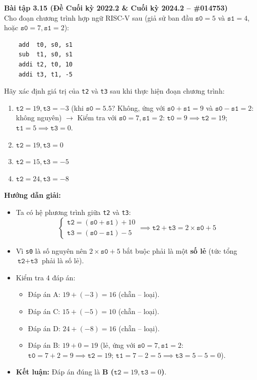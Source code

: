 \textbf{Bài tập 3.15 (Đề Cuối kỳ 2022.2 \& Cuối kỳ 2024.2 -- \#014753)}\\
Cho đoạn chương trình hợp ngữ RISC-V sau (giả sử ban đầu $\texttt{s0} = 5$ và $\texttt{s1} = 4$, hoặc $\texttt{s0} = 7, \texttt{s1} = 2$):
\begin{lstlisting}
    add  t0, s0, s1
    sub  t1, s0, s1
    addi t2, t0, 10
    addi t3, t1, -5
\end{lstlisting}
Hãy xác định giá trị của \texttt{t2} và \texttt{t3} sau khi thực hiện đoạn chương trình:
\begin{enumerate}[label=\Alph*.]
    \item $\texttt{t2} = 19, \texttt{t3} = -3$ (khi $\texttt{s0} = 5.5$? Không, ứng với $\texttt{s0} + \texttt{s1} = 9$ và $\texttt{s0} - \texttt{s1} = 2$: không nguyên) $\rightarrow$ Kiểm tra với $\texttt{s0} = 7, \texttt{s1} = 2$: $\texttt{t0} = 9 \implies \texttt{t2} = 19$; $\texttt{t1} = 5 \implies \texttt{t3} = 0$.
    \item $\texttt{t2} = 19, \texttt{t3} = 0$
    \item $\texttt{t2} = 15, \texttt{t3} = -5$
    \item $\texttt{t2} = 24, \texttt{t3} = -8$
\end{enumerate}
\textbf{Hướng dẫn giải:}
\begin{itemize}
    \item Ta có hệ phương trình giữa \texttt{t2} và \texttt{t3}:
    $$\begin{cases} \texttt{t2} = (\texttt{s0} + \texttt{s1}) + 10 \\ \texttt{t3} = (\texttt{s0} - \texttt{s1}) - 5 \end{cases} \implies \texttt{t2} + \texttt{t3} = 2 \times \texttt{s0} + 5$$
    \item Vì \texttt{s0} là số nguyên nên $2 \times \texttt{s0} + 5$ bắt buộc phải là một \textbf{số lẻ} (tức tổng $\texttt{t2} + \texttt{t3}$ phải là số lẻ).
    \item Kiểm tra 4 đáp án:
    \begin{itemize}
        \item Đáp án A: $19 + (-3) = 16$ (chẵn -- loại).
        \item Đáp án C: $15 + (-5) = 10$ (chẵn -- loại).
        \item Đáp án D: $24 + (-8) = 16$ (chẵn -- loại).
        \item Đáp án B: $19 + 0 = 19$ (lẻ, ứng với $\texttt{s0} = 7, \texttt{s1} = 2$: $\texttt{t0} = 7 + 2 = 9 \implies \texttt{t2} = 19$; $\texttt{t1} = 7 - 2 = 5 \implies \texttt{t3} = 5 - 5 = 0$).
    \end{itemize}
    \item \textbf{Kết luận:} Đáp án đúng là \textbf{B ($\texttt{t2} = 19, \texttt{t3} = 0$)}.
\end{itemize}

